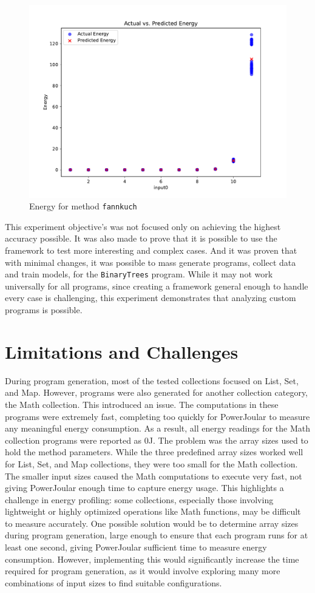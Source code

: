 {\begin{figure}[htbp]
  \centering
  \includegraphics[width = .7 \textwidth]{figures/fannkuch_plot.pdf}
  \caption{Energy for method \texttt{fannkuch}}
  \label{fig:fannkuch_plot}
\end{figure}

This experiment objective's was not focused only on achieving the highest accuracy possible. It was also made to prove that it is possible to use the framework to test more interesting and complex cases. And it was proven that with minimal changes, it was possible to mass generate programs, collect data and train models, for the \texttt{BinaryTrees} program. While it may not work universally for all programs, since creating a framework general enough to handle every case is challenging, this experiment demonstrates that analyzing custom programs is possible.
}





\section{Limitations and Challenges} \label{sec:limitations_and_challenges}

During program generation, most of the tested collections focused on List, Set, and Map. However, programs were also generated for another collection category, the Math collection. This introduced an issue. The computations in these programs were extremely fast, completing too quickly for PowerJoular to measure any meaningful energy consumption. As a result, all energy readings for the Math collection programs were reported as 0J.
The problem was the array sizes used to hold the method parameters. While the three predefined array sizes worked well for List, Set, and Map collections, they were too small for the Math collection. The smaller input sizes caused the Math computations to execute very fast, not giving PowerJoular enough time to capture energy usage.
This highlights a challenge in energy profiling: some collections, especially those involving lightweight or highly optimized operations like Math functions, may be difficult to measure accurately. One possible solution would be to determine array sizes during program generation, large enough to ensure that each program runs for at least one second, giving PowerJoular sufficient time to measure energy consumption. However, implementing this would significantly increase the time required for program generation, as it would involve exploring many more combinations of input sizes to find suitable configurations.


